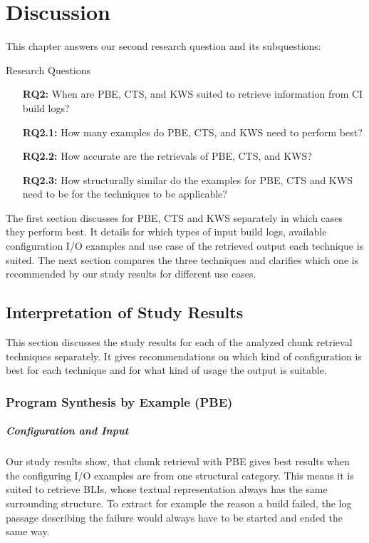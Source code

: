 \documentclass[\myrootdir/main.tex]{subfiles}
\begin{document}
\chapter{Discussion}

This chapter answers our second research question and its subquestions:
\begin{simplebox}{Research Questions}
\begin{itemize}
  \item[\textbf{RQ2:}] When are PBE, CTS, and KWS suited to retrieve information from CI build logs?
  \item[\textbf{RQ2.1:}] How many examples do PBE, CTS, and KWS need to perform best?
  \item[\textbf{RQ2.2:}] How accurate are the retrievals of PBE, CTS, and KWS?
  \item[\textbf{RQ2.3:}] How structurally similar do the examples for PBE, CTS and KWS need to be for the techniques to be applicable?
\end{itemize}
\end{simplebox}

The first section discusses for PBE, CTS and KWS separately in which cases they perform best.
It details for which types of input build logs, available configuration I/O examples and use case of the retrieved output each technique is suited.
The next section compares the three techniques and clarifies which one is recommended by our study results for different use cases.

\section{Interpretation of Study Results}
This section discusses the study results for each of the analyzed chunk retrieval techniques separately.
It gives recommendations on which kind of configuration is best for each technique and for what kind of usage the output is suitable.

\subsection{Program Synthesis by Example (PBE)}
\paragraph{Configuration and Input}
Our study results show, that chunk retrieval with PBE gives best results when the configuring I/O examples are from one structural category.
This means it is suited to retrieve BLIs, whose textual representation always has the same surrounding structure.
To extract for example the reason a build failed, the log passage describing the failure would always have to be started and ended the same way.
\end{document}
